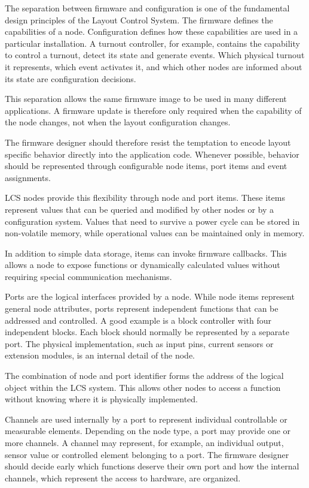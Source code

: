 The separation between firmware and configuration is one of the fundamental
design principles of the Layout Control System.
The firmware defines the capabilities of a node. Configuration defines how
these capabilities are used in a particular installation. A turnout controller,
for example, contains the capability to control a turnout, detect its state and
generate events. Which physical turnout it represents, which event activates it,
and which other nodes are informed about its state are configuration decisions.

This separation allows the same firmware image to be used in many different
applications. A firmware update is therefore only required when the capability
of the node changes, not when the layout configuration changes.

The firmware designer should therefore resist the temptation to encode layout
specific behavior directly into the application code. Whenever possible,
behavior should be represented through configurable node items, port items and
event assignments.

LCS nodes provide this flexibility through node and port items. These items
represent values that can be queried and modified by other nodes or by a
configuration system. Values that need to survive a power cycle can be stored in
non-volatile memory, while operational values can be maintained only in memory.

In addition to simple data storage, items can invoke firmware callbacks. This
allows a node to expose functions or dynamically calculated values without
requiring special communication mechanisms.


Ports are the logical interfaces provided by a node. While node items represent
general node attributes, ports represent independent functions that can be
addressed and controlled.
A good example is a block controller with four independent blocks. Each
block should normally be represented by a separate port. The physical
implementation, such as input pins, current sensors or extension modules, is an
internal detail of the node.

The combination of node and port identifier forms the address of the logical
object within the LCS system. This allows other nodes to access a function
without knowing where it is physically implemented.

Channels are used internally by a port to represent individual controllable or
measurable elements. Depending on the node type, a port may provide one or more
channels. A channel may represent, for example, an individual output, sensor
value or controlled element belonging to a port.
The firmware designer should decide early which functions deserve their own
port and how the internal channels, which represent the access to hardware, 
are organized.

